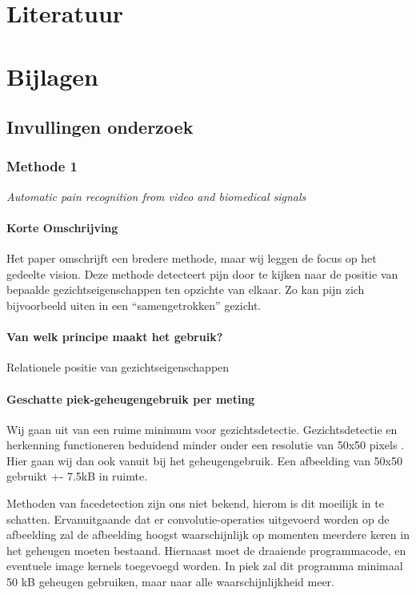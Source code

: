 \documentclass[11pt]{article}
\begin{document}
    \section{Literatuur}


    \section{Bijlagen}

    \subsection{Invullingen onderzoek}

    \subsubsection{Methode 1}
    \emph{\citet{werner2014automatic} Automatic pain recognition from video and biomedical signals}

    \paragraph{Korte Omschrijving}
    Het paper omschrijft een bredere methode, maar wij leggen de focus op het gedeelte vision.
    Deze methode detecteert pijn door te kijken naar de positie van bepaalde gezichtseigenschappen ten opzichte van elkaar.
    Zo kan pijn zich bijvoorbeeld uiten in een “samengetrokken” gezicht.

    \paragraph{Van welk principe maakt het gebruik?}
    Relationele positie van gezichtseigenschappen

    \paragraph{Geschatte piek-geheugengebruik per meting}
    Wij gaan uit van een ruime minimum voor gezichtsdetectie.
    Gezichtsdetectie en herkenning functioneren beduidend minder onder een resolutie van 50x50 pixels \citet{boom2006effect}.
    Hier gaan wij dan ook vanuit bij het geheugengebruik.
    Een afbeelding van 50x50 gebruikt +- 7.5kB in ruimte.

    Methoden van facedetection zijn ons niet bekend, hierom is dit moeilijk in te schatten.
    Ervanuitgaande dat er convolutie-operaties uitgevoerd worden op de afbeelding zal de afbeelding hoogst waarschijnlijk op momenten meerdere keren in het geheugen moeten bestaand.
    Hiernaast moet de draaiende programmacode, en eventuele image kernels toegevoegd worden.
    In piek zal dit programma minimaal 50 kB geheugen gebruiken, maar naar alle waarschijnlijkheid meer.
\end{document}
